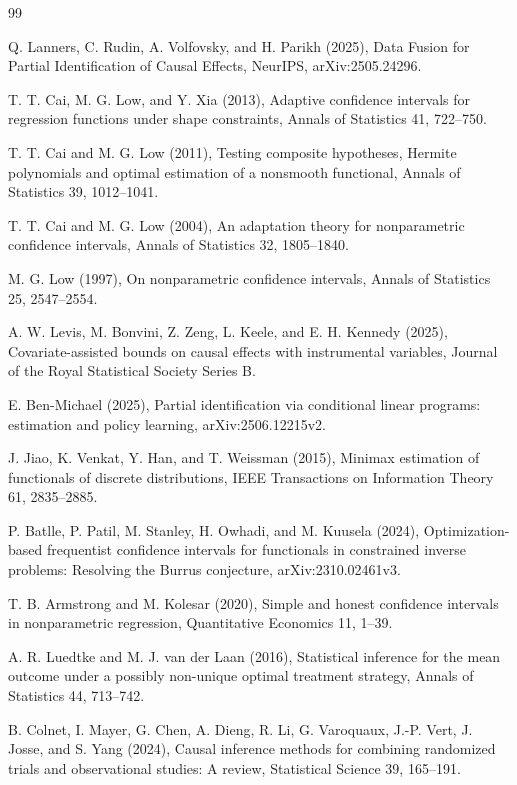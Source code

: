 \documentclass{article}
\begin{document}
\begin{thebibliography}{99}

   Q. Lanners, C. Rudin, A. Volfovsky, and H. Parikh (2025), Data Fusion for Partial Identification of Causal Effects, NeurIPS, arXiv:2505.24296.

   T. T. Cai, M. G. Low, and Y. Xia (2013), Adaptive confidence intervals for regression functions under shape constraints, Annals of Statistics 41, 722--750.

   T. T. Cai and M. G. Low (2011), Testing composite hypotheses, Hermite polynomials and optimal estimation of a nonsmooth functional, Annals of Statistics 39, 1012--1041.

   T. T. Cai and M. G. Low (2004), An adaptation theory for nonparametric confidence intervals, Annals of Statistics 32, 1805--1840.

   M. G. Low (1997), On nonparametric confidence intervals, Annals of Statistics 25, 2547--2554.

   A. W. Levis, M. Bonvini, Z. Zeng, L. Keele, and E. H. Kennedy (2025), Covariate-assisted bounds on causal effects with instrumental variables, Journal of the Royal Statistical Society Series B.

   E. Ben-Michael (2025), Partial identification via conditional linear programs: estimation and policy learning, arXiv:2506.12215v2.

   J. Jiao, K. Venkat, Y. Han, and T. Weissman (2015), Minimax estimation of functionals of discrete distributions, IEEE Transactions on Information Theory 61, 2835--2885.

   P. Batlle, P. Patil, M. Stanley, H. Owhadi, and M. Kuusela (2024), Optimization-based frequentist confidence intervals for functionals in constrained inverse problems: Resolving the Burrus conjecture, arXiv:2310.02461v3.

   T. B. Armstrong and M. Kolesar (2020), Simple and honest confidence intervals in nonparametric regression, Quantitative Economics 11, 1--39.

   A. R. Luedtke and M. J. van der Laan (2016), Statistical inference for the mean outcome under a possibly non-unique optimal treatment strategy, Annals of Statistics 44, 713--742.

   B. Colnet, I. Mayer, G. Chen, A. Dieng, R. Li, G. Varoquaux, J.-P. Vert, J. Josse, and S. Yang (2024), Causal inference methods for combining randomized trials and observational studies: A review, Statistical Science 39, 165--191.

\end{thebibliography}
\end{document}
